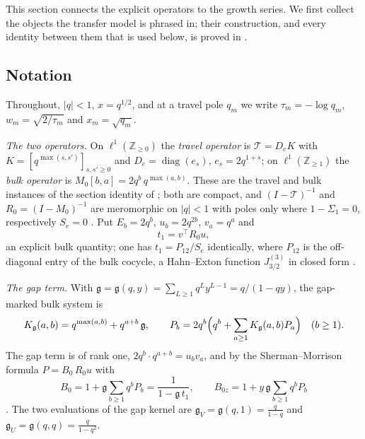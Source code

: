 \documentclass[11pt]{article}
\theoremstyle{plain}
\theoremstyle{definition}
\theoremstyle{remark}
\newcommand{\Z}{\mathbb{Z}}
\theoremstyle{plain}\newtheorem*{maintheorem}{Main Theorem}
\begin{document}
This section connects the explicit operators to the growth series. We first collect the objects
the transfer model is phrased in; their construction, and every identity between them that is used
below, is proved in \cite[\S\,\textup{sec:assembly}]{Bonfioli2026bB}.

\subsection{Notation}\label{sec:notation}

Throughout, $|q|<1$, $x=q^{1/2}$, and at a travel pole $q_m$ we write $\tau_m=-\log q_m$,
$w_m=\sqrt{2/\tau_m}$ and $x_m=\sqrt{q_m}$.

\emph{The two operators.} On $\ell^1(\Z_{\ge0})$ the \emph{travel operator} is $\mathcal T=D_eK$
with $K=[q^{\max(s,s')}]_{s,s'\ge0}$ and $D_e=\operatorname{diag}(e_s)$, $e_s=2q^{1+s}$; on
$\ell^1(\Z_{\ge1})$ the \emph{bulk operator} is $M_0[b,a]=2q^b\,q^{\max(a,b)}$. These are the travel
and bulk instances of the section identity of
\cite[Definition ``section identity'', \textup{def:model}]{Bonfioli2026bB}; both are compact, and
$(I-\mathcal T)^{-1}$ and $R_0=(I-M_0)^{-1}$ are meromorphic on $|q|<1$ with poles only where
$1-\Sigma_1=0$, respectively $S_e=0$
\cite[Corollary ``singularities of the two gapless resolvents'', \textup{cor:sing}]{Bonfioli2026bB}.
Put $E_b=2q^b$, $u_b=2q^{2b}$, $v_a=q^a$ and
\[
   t_1=v^{\!\top}R_0u ,
\]
an explicit bulk quantity; one has $t_1=P_{12}/S_e$ identically, where $P_{12}$ is the off-diagonal
entry of the bulk cocycle, a Hahn--Exton function $J^{(3)}_{3/2}$ in closed form
\cite[Corollary ``the cocycle is the same object'', \textup{cor:cocycle}]{Bonfioli2026bB}.

\emph{The gap term.} With $\mathfrak g=\mathfrak g(q,y)=\sum_{L\ge1}q^Ly^{L-1}=q/(1-qy)$, the
gap-marked bulk system is
\begin{equation}\label{eq:gapkernel}
   K_{\mathfrak g}(a,b)=q^{\max(a,b)}+q^{a+b}\,\mathfrak g,\qquad
   P_b=2q^b\Bigl(q^b+\sum_{a\ge1}K_{\mathfrak g}(a,b)P_a\Bigr)\quad(b\ge1).
\end{equation}
The gap term is of rank one, $2q^b\cdot q^{a+b}=u_bv_a$, and by the Sherman--Morrison formula
$P=B_0\,R_0u$ with
\[
   B_0=1+\mathfrak g\sum_{b\ge1}q^bP_b=\frac1{1-\mathfrak g\,t_1},\qquad
   B_{0z}=1+y\,\mathfrak g\sum_{b\ge1}q^bP_b
\]
\cite[Proposition ``M\"obius factorisation'', \textup{prop:mobius}; Remark ``the bulk sum of the
model'', \textup{rem:bulksource}]{Bonfioli2026bB}. The two evaluations of the gap kernel are
$\mathfrak g_V=\mathfrak g(q,1)=\tfrac q{1-q}$ and $\mathfrak g_U=\mathfrak g(q,q)=\tfrac q{1-q^2}$.
\end{document}
